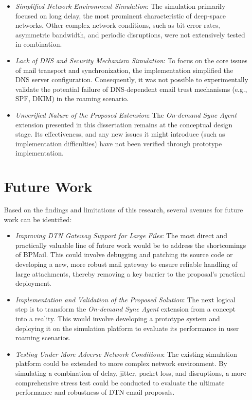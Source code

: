 \begin{itemize}
    \item \textit{Simplified Network Environment Simulation}: The simulation primarily focused on long delay, the most prominent characteristic of deep-space networks. Other complex network conditions, such as bit error rates, asymmetric bandwidth, and periodic disruptions, were not extensively tested in combination.
    \item \textit{Lack of DNS and Security Mechanism Simulation}: To focus on the core issues of mail transport and synchronization, the implementation simplified the DNS server configuration. Consequently, it was not possible to experimentally validate the potential failure of DNS-dependent email trust mechanisms (e.g., SPF, DKIM) in the roaming scenario.
    \item \textit{Unverified Nature of the Proposed Extension}: The \textit{On-demand Sync Agent} extension presented in this dissertation remains at the conceptual design stage. Its effectiveness, and any new issues it might introduce (such as implementation difficulties) have not been verified through prototype implementation.
\end{itemize}

\section{Future Work}

Based on the findings and limitations of this research, several avenues for future work can be identified:

\begin{itemize}
    \item \textit{Improving DTN Gateway Support for Large Files}: The most direct and practically valuable line of future work would be to address the shortcomings of BPMail. This could involve debugging and patching its source code or developing a new, more robust mail gateway to ensure reliable handling of large attachments, thereby removing a key barrier to the proposal's practical deployment.
    \item \textit{Implementation and Validation of the Proposed Solution}: The next logical step is to transform the \textit{On-demand Sync Agent} extension from a concept into a reality. This would involve developing a prototype system and deploying it on the simulation platform to evaluate its performance in user roaming scenarios.
    \item \textit{Testing Under More Adverse Network Conditions}: The existing simulation platform could be extended to more complex network environment. By simulating a combination of delay, jitter, packet loss, and disruptions, a more comprehensive stress test could be conducted to evaluate the ultimate performance and robustness of DTN email proposals.
\end{itemize}
